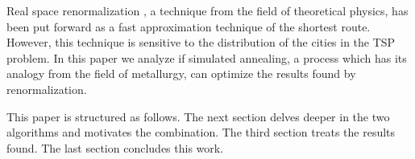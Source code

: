 Real space renormalization \cite{yoshiyuki1995nms}, a technique from the field
of theoretical physics, has been put forward as a fast approximation technique
of the shortest route.  However, this technique is sensitive to the distribution
of the cities in the TSP problem. In this paper we analyze if simulated
annealing, a process which has its analogy from the field of metallurgy, can
optimize the results found by renormalization.

This paper is structured as follows. The next section delves deeper in the two
algorithms and motivates the combination. The third section treats the results
found. The last section concludes this work.
\IEEEpubidadjcol %


